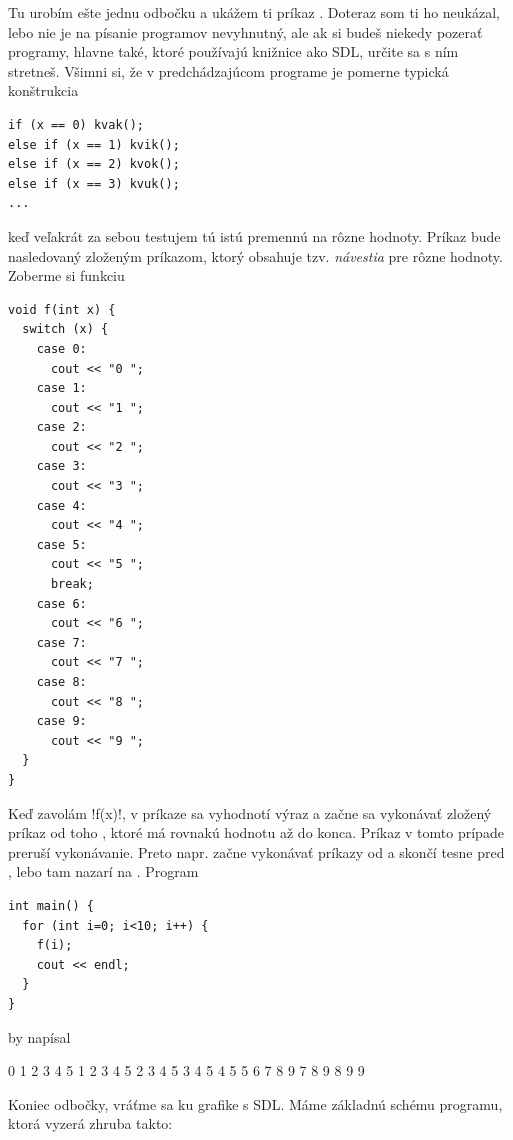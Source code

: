 Tu urobím ešte jednu odbočku a ukážem ti príkaz . Doteraz som ti ho neukázal,
lebo nie je na písanie programov nevyhnutný, ale ak si budeš niekedy pozerať programy, hlavne 
také, ktoré používajú knižnice ako SDL, určite sa s ním stretneš. Všimni si, že v 
predchádzajúcom programe je pomerne typická konštrukcia

\begin{lstlisting}
if (x == 0) kvak(); 
else if (x == 1) kvik();
else if (x == 2) kvok();
else if (x == 3) kvuk();
...
\end{lstlisting}

keď veľakrát za sebou testujem tú istú premennú na rôzne hodnoty. 
Príkaz  bude nasledovaný zloženým príkazom, ktorý obsahuje tzv. 
{\em návestia}  pre rôzne hodnoty. Zoberme si funkciu

  \begin{lstlisting}
void f(int x) {
  switch (x) {
    case 0:
      cout << "0 ";
    case 1:
      cout << "1 ";
    case 2:
      cout << "2 ";
    case 3:
      cout << "3 ";
    case 4:
      cout << "4 ";
    case 5:
      cout << "5 ";
      break;
    case 6:
      cout << "6 ";
    case 7:
      cout << "7 ";
    case 8:
      cout << "8 ";
    case 9:
      cout << "9 ";
  } 
}
  \end{lstlisting}

  Keď zavolám \prg!f(x)!, v príkaze  sa vyhodnotí výraz 
  a začne sa vykonávať zložený príkaz od toho , ktoré má rovnakú hodnotu
  až do konca. Príkaz  v tomto prípade preruší vykonávanie. Preto napr.
   začne vykonávať príkazy od  a skončí tesne pred ,
  lebo tam nazarí na . Program

\begin{lstlisting}
int main() {
  for (int i=0; i<10; i++) { 
    f(i); 
    cout << endl; 
  }
}
\end{lstlisting}

by napísal

\begin{outputBox}
0 1 2 3 4 5 
1 2 3 4 5 
2 3 4 5 
3 4 5 
4 5 
5 
6 7 8 9 
7 8 9 
8 9 
9
\end{outputBox}

Koniec odbočky, vráťme sa ku grafike s SDL. Máme základnú schému programu, ktorá vyzerá zhruba takto:


